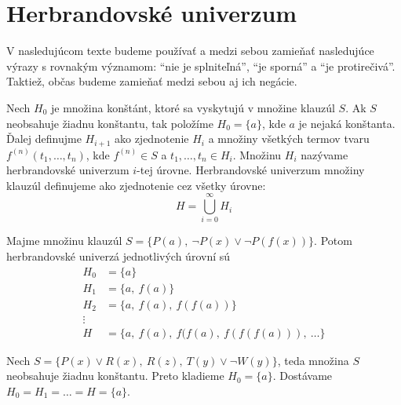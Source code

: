 \section{Herbrandovské univerzum}

\begin{poznamka}
    V nasledujúcom texte budeme používať a medzi sebou zamieňať
    nasledujúce výrazy s rovnakým významom:
    ``nie je splniteľná'', 
    ``je sporná'' a
    ``je protirečivá''. Taktiež, občas budeme zamieňať medzi sebou
    aj ich negácie.
\end{poznamka}

\begin{definicia}
    Nech $H_0$ je množina konštánt, ktoré sa vyskytujú v množine
    klauzúl $S$.
    Ak $S$ neobsahuje žiadnu konštantu, tak položíme $H_0=\{ a \}$,
    kde $a$ je nejaká konštanta.
    Ďalej definujme $H_{i+1}$ ako zjednotenie $H_{i}$ a množiny všetkých termov
    tvaru $f^{(n)}(t_1,\dots, t_n)$, kde $f^{(n)} \in S$ a
    $t_1, \dots, t_n \in H_i$.
    Množinu $H_i$ nazývame
    {\rm herbrandovské univerzum $i$-tej úrovne}.
    Herbrandovské univerzum množiny klauzúl definujeme ako zjednotenie
    cez všetky úrovne:
    \begin{equation*}
        H=\bigcup_{i=0}^{\infty} H_i
    \end{equation*}
\end{definicia}

\begin{priklad}
    Majme množinu klauzúl
    $S= \{ P(a),\ \neg P(x) \lor \neg P(f(x))\}$.
    Potom herbrandovské univerzá jednotlivých úrovní sú
    \begin{align*}
        H_0& = \{ a \} \\
        H_1& = \{ a,\ f(a) \} \\
        H_2& = \{ a,\ f(a),\ f(f(a)) \} \\
         \vdots\ \ &\\
        H_{\phantom{0}} &= \{ a,\ f(a),\ f(f(a),\ f(f(f(a))),\ \dots \}
    \end{align*}
\end{priklad}

\begin{priklad}
    Nech $S=\{P(x) \lor R(x),\ R(z),\ T(y) \lor \neg W(y) \}$, teda
    množina $S$ neobsahuje žiadnu konštantu.
    Preto kladieme $H_0 = \{ a \}$. Dostávame
    $H_0=H_1=\dots=H=\{a\}$.
\end{priklad}

